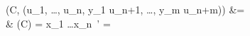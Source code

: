 \fieldMap(C, (u_1, \ldots, u_n, y_1 \mathord{=} u_{n+1}, \ldots, y_m \mathord{=} u_{n+m}))
   &{}=  \\
   &\qquad {} \fields(C) = x_1 \cons \ldots \cons x_n \cons {}\,'   = 
